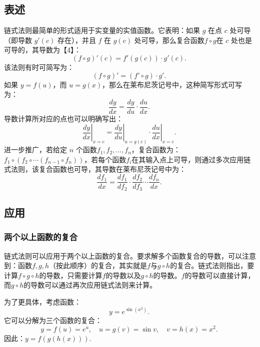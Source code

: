 \subsection{表述}
链式法则最简单的形式适用于实变量的实值函数。它表明：如果 $g$ 在点 $c$ 处可导（即导数 $g'(c)$ 存在），并且 $f$ 在 $g(c)$ 处可导，那么复合函数$f \circ g$在 $c$ 处也是可导的，其导数为【4】：
$$
(f \circ g)'(c) = f'(g(c)) \cdot g'(c).~
$$
该法则有时可简写为：
$$
(f \circ g)' = (f' \circ g) \cdot g'.~
$$
如果 $y = f(u)$，而 $u = g(x)$，那么在莱布尼茨记号中，这种简写形式可写为：
$$
\frac{dy}{dx} = \frac{dy}{du} \cdot \frac{du}{dx}.~
$$
导数计算所对应的点也可以明确写出：
$$
\left.\frac{dy}{dx}\right|_{x=c} = \left.\frac{dy}{du}\right|_{u=g(c)} \cdot \left.\frac{du}{dx}\right|_{x=c}.~
$$
进一步推广，若给定 $n$ 个函数$f_1, f_2, \ldots, f_n$，复合函数为：$f_1 \circ (f_2 \circ \cdots (f_{n-1} \circ f_n))$，若每个函数$f_i$在其输入点上可导，则通过多次应用链式法则，该复合函数也可导，其导数在莱布尼茨记号中为：
$$
\frac{df_1}{dx} = \frac{df_1}{df_2} \cdot \frac{df_2}{df_3} \cdots \frac{df_n}{dx}.~
$$
\subsection{应用}
\subsubsection{两个以上函数的复合}
链式法则可以应用于两个以上函数的复合。要求解多个函数复合的导数，可以注意到：函数$f, g, h$（按此顺序）的复合，其实就是$f$与$g \circ h$的复合。链式法则指出，要计算$f \circ g \circ h$的导数，只需要计算$f$的导数以及$g \circ h$的导数。$f$的导数可以直接计算，而$g \circ h$的导数可以通过再次应用链式法则来计算。

为了更具体，考虑函数：
$$
y = e^{\sin(x^2)}.~
$$
它可以分解为三个函数的复合：
$$
y = f(u) = e^u, \quad u = g(v) = \sin v, \quad v = h(x) = x^2.~
$$
因此：$y = f(g(h(x)))$.

